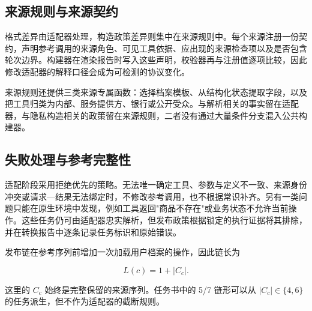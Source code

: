 \subsection{来源规则与来源契约}

格式差异由适配器处理，构造政策差异则集中在来源规则中。每个来源注册一份契约，声明参考调用的来源角色、可见工具依据、应出现的来源检查项以及是否包含轮次边界。构建器在渲染报告时写入这些声明，校验器再与注册值逐项比较，因此修改适配器的解释口径会成为可检测的协议变化。

来源规则还提供三类来源专属函数：选择档案模板、从结构化状态提取字段，以及把工具归类为内部、服务提供方、银行或公开受众。与解析相关的事实留在适配器，与隐私构造相关的政策留在来源规则，二者没有通过大量条件分支混入公共构建器。

\subsection{失败处理与参考完整性}

适配阶段采用拒绝优先的策略。无法唯一确定工具、参数与定义不一致、来源身份冲突或请求—结果无法绑定时，不修改参考调用，也不根据常识补齐。另有一类问题只能在原生环境中发现，例如工具返回"商品不存在"或业务状态不允许当前操作。这些任务仍可由适配器忠实解析，但发布政策根据锁定的执行证据将其排除，并在转换报告中逐条记录任务标识和原始错误。

发布链在参考序列前增加一次加载用户档案的操作，因此链长为

\begin{equation}
L(c)=1+|C_c|.
\end{equation}

这里的 $C_c$ 始终是完整保留的来源序列。任务书中的 5/7 链形可以从 $|C_c|\in\{4,6\}$ 的任务派生，但不作为适配器的截断规则。
